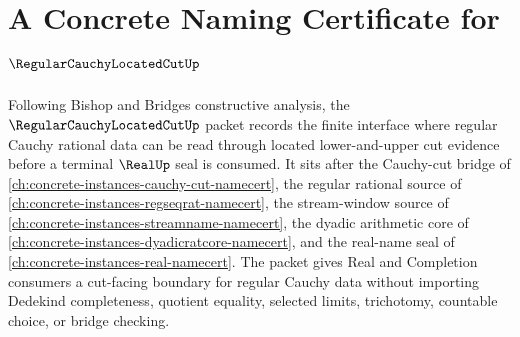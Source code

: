 \chapter{A Concrete Naming Certificate for $\RegularCauchyLocatedCutUp$}
\label{ch:concrete-instances-regular-cauchy-located-cut-namecert}

Following Bishop and Bridges constructive analysis, the $\RegularCauchyLocatedCutUp$ packet records the finite interface where regular Cauchy rational data can be read through located lower-and-upper cut evidence before a terminal $\RealUp$ seal is consumed. It sits after the Cauchy-cut bridge of \autoref{ch:concrete-instances-cauchy-cut-namecert}, the regular rational source of \autoref{ch:concrete-instances-regseqrat-namecert}, the stream-window source of \autoref{ch:concrete-instances-streamname-namecert}, the dyadic arithmetic core of \autoref{ch:concrete-instances-dyadicratcore-namecert}, and the real-name seal of \autoref{ch:concrete-instances-real-namecert}. The packet gives Real and Completion consumers a cut-facing boundary for regular Cauchy data without importing Dedekind completeness, quotient equality, selected limits, trichotomy, countable choice, or bridge checking.

